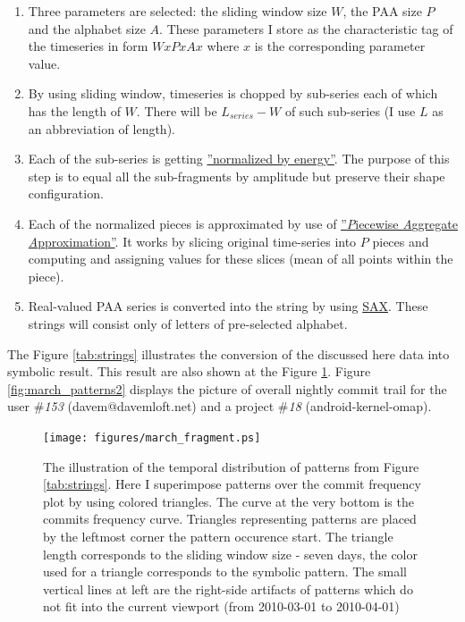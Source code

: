 \documentclass[a4paper,10pt]{article}
\numberwithin{equation}{subsection}
\begin{document}
\begin{enumerate}
 \item Three parameters are selected: the sliding window size $W$, the PAA size $P$ and the alphabet size $A$. These parameters I store as the 
characteristic tag of the timeseries in form $WxPxAx$ where $x$ is the corresponding parameter value.
 \item By using sliding window, timeseries is chopped by sub-series each of which has the length of $W$. 
       There will be $L_{series} - W$ of such sub-series (I use $L$ as an abbreviation of length).
 \item Each of the sub-series is getting \href{''http://code.google.com/p/jmotif/wiki/ZNormalization''}{''normalized by energy''}.
       The purpose of this step is to equal all the sub-fragments by amplitude but preserve their shape configuration.
 \item Each of the normalized pieces is approximated by use of 
   \href{''http://code.google.com/p/jmotif/wiki/PAAapproximation''}{''\emph{P}iecewise \emph{A}ggregate \emph{A}pproximation''}.
   It works by slicing original time-series into $P$ pieces and computing and assigning values for these slices 
   (mean of all points within the piece). 
 \item Real-valued PAA series is converted into the string by using \href{http://code.google.com/p/jmotif/wiki/SAX}{SAX}.
       These strings will consist only of letters of pre-selected alphabet.
\end{enumerate}

The Figure \ref{tab:strings} illustrates the conversion of the discussed here data into symbolic result. 
This result are also shown at the Figure \ref{fig:march_patterns}. Figure \ref{fig:march_patterns2} displays the picture
of overall nightly commit trail for the user \#\emph{153} (davem$@$davemloft.net) and a project \#\emph{18} (android-kernel-omap).
\begin{figure}[h]
\noindent\begin{minipage}{\textwidth}
  \centering
  \texttt{[image: figures/march\_fragment.ps]}
  \caption{The illustration of the temporal distribution of patterns from Figure \ref{tab:strings}. Here I superimpose patterns over the 
commit frequency plot by using colored triangles. The curve at the very bottom is the commits frequency curve. Triangles representing 
patterns are  placed by the leftmost corner the pattern occurence start. The triangle length corresponds to the sliding window size -
 seven days, the color used for a triangle corresponds to the symbolic pattern. The small vertical lines at left are the right-side 
artifacts of patterns which do not fit into the current viewport (from 2010-03-01 to 2010-04-01)}
  \label{fig:march_patterns}
\end{minipage}
\end{figure}
\end{document}
